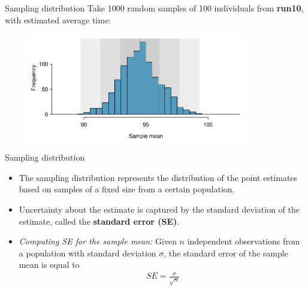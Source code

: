 \documentclass[12pt,a4paper]{beamer}
\begin{document}
\begin{frame}{Sampling distribution}
	Take 1000 random samples of 100 individuals from \textbf{run10}, with estimated average time:
	\begin{figure}
	 	\centering
		\begin{minipage}{.5\textwidth}
		  \centering\begin{table}[h]
	\centering
	\end{table}
\end{minipage}%
\begin{minipage}{.65\textwidth}\centering
   \includegraphics[width=0.85\textwidth]{figures/netTime1000SamplingDistribution/netTime1000SamplingDistribution}
\end{minipage}
\end{figure}
\end{frame}
\begin{frame}{Sampling distribution}
	\begin{itemize}
		\item The sampling distribution represents the distribution of the point estimates based on samples of a fixed size from a certain population.
		\item Uncertainty about the estimate is captured by the standard deviation of the estimate, called the \textbf{standard error (SE)}.
			\item \textit{Computing SE for the sample mean:}
			Given $n$ independent observations from a population with standard deviation $\sigma$, the standard error of the sample mean is equal to \vspace{-1mm}
			\begin{eqnarray}
			SE = \frac{\sigma}{\sqrt{n}}
			\label{seOfXBar}
			\end{eqnarray}
	\end{itemize}
\end{frame}
\end{document}
